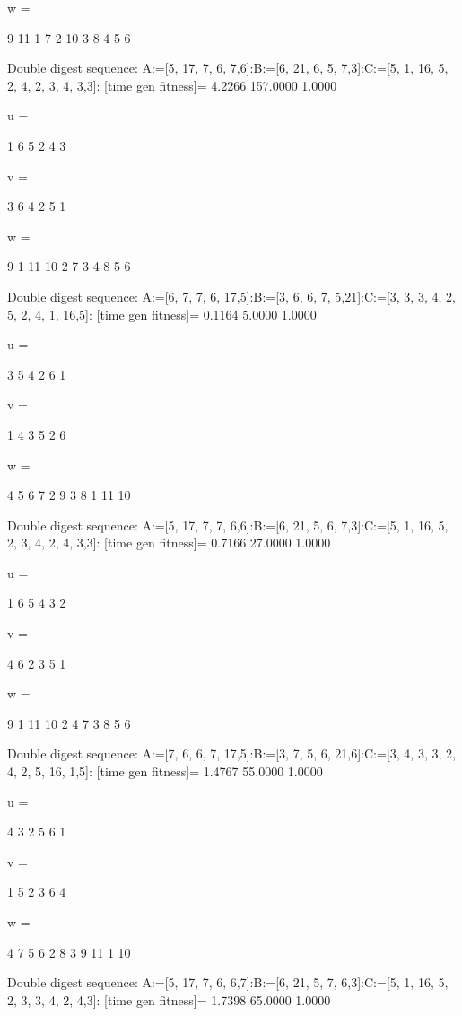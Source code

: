 w =

     9    11     1     7     2    10     3     8     4     5     6

Double digest sequence:
A:=[5, 17, 7, 6, 7,6]:B:=[6, 21, 6, 5, 7,3]:C:=[5, 1, 16, 5, 2, 4, 2, 3, 4, 3,3]:
[time gen fitness]=
    4.2266  157.0000    1.0000


u =

     1     6     5     2     4     3


v =

     3     6     4     2     5     1


w =

     9     1    11    10     2     7     3     4     8     5     6

Double digest sequence:
A:=[6, 7, 7, 6, 17,5]:B:=[3, 6, 6, 7, 5,21]:C:=[3, 3, 3, 4, 2, 5, 2, 4, 1, 16,5]:
[time gen fitness]=
    0.1164    5.0000    1.0000


u =

     3     5     4     2     6     1


v =

     1     4     3     5     2     6


w =

     4     5     6     7     2     9     3     8     1    11    10

Double digest sequence:
A:=[5, 17, 7, 7, 6,6]:B:=[6, 21, 5, 6, 7,3]:C:=[5, 1, 16, 5, 2, 3, 4, 2, 4, 3,3]:
[time gen fitness]=
    0.7166   27.0000    1.0000


u =

     1     6     5     4     3     2


v =

     4     6     2     3     5     1


w =

     9     1    11    10     2     4     7     3     8     5     6

Double digest sequence:
A:=[7, 6, 6, 7, 17,5]:B:=[3, 7, 5, 6, 21,6]:C:=[3, 4, 3, 3, 2, 4, 2, 5, 16, 1,5]:
[time gen fitness]=
    1.4767   55.0000    1.0000


u =

     4     3     2     5     6     1


v =

     1     5     2     3     6     4


w =

     4     7     5     6     2     8     3     9    11     1    10

Double digest sequence:
A:=[5, 17, 7, 6, 6,7]:B:=[6, 21, 5, 7, 6,3]:C:=[5, 1, 16, 5, 2, 3, 3, 4, 2, 4,3]:
[time gen fitness]=
    1.7398   65.0000    1.0000


